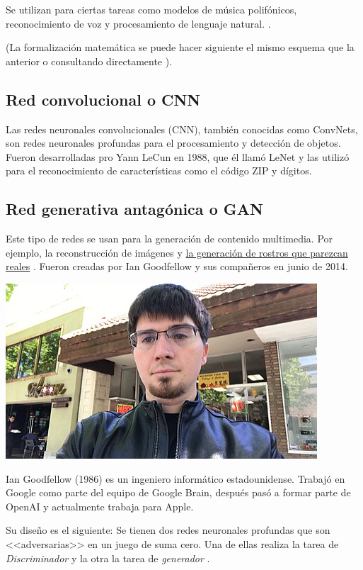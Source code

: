 \documentclass[11pt,twoside,titlepage,a4paper]{article}
\numberwithin{equation}{section} %
\theoremstyle{usual}
\begin{document}
Se utilizan para ciertas tareas como modelos de música polifónicos, reconocimiento de voz y procesamiento de lenguaje natural.  
\cite{GRU-wikipedia}.  

(La formalización matemática se puede hacer siguiente el mismo esquema que la anterior o consultando directamente \cite{GRU-wikipedia}). 

\subsection{Red convolucional o CNN}

Las redes neuronales convolucionales (CNN), también conocidas como ConvNets, son redes neuronales profundas para el procesamiento y detección de objetos. Fueron desarrolladas pro Yann LeCun en 1988, que él llamó LeNet y las utilizó para el reconocimiento de características como el código ZIP y dígitos.

\subsection{Red generativa antagónica o GAN}
Este tipo de redes se usan para la generación de contenido multimedia. Por ejemplo, la reconstrucción de imágenes y \href{https://thispersondoesnotexist.com}{la generación de rostros que parezcan reales} \cite{gan-explanacion}. Fueron creadas por Ian Goodfellow y sus compañeros en junio de 2014.

\begin{marginfigure}
    \includegraphics[width=\marginparwidth]{Source/images/Ian_Goodfellow.jpg}
    \caption{Ian Goodfellow (1986) es un ingeniero informático estadounidense. Trabajó en Google como parte del equipo de Google Brain, después pasó a formar parte de OpenAI y actualmente trabaja para Apple.}
\end{marginfigure}

Su diseño es el siguiente: 
Se tienen dos redes neuronales profundas que son <<adversarias>> en un juego de suma cero. Una de ellas realiza la tarea de \textit{Discriminador} y la otra la tarea de \textit{generador} .
\end{document}
